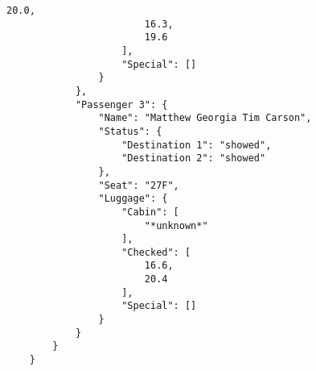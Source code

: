 \begin{lstlisting}[basicstyle=\scriptsize]
                        20.0,
                        16.3,
                        19.6
                    ],
                    "Special": []
                }
            },
            "Passenger 3": {
                "Name": "Matthew Georgia Tim Carson",
                "Status": {
                    "Destination 1": "showed",
                    "Destination 2": "showed"
                },
                "Seat": "27F",
                "Luggage": {
                    "Cabin": [
                        "*unknown*"
                    ],
                    "Checked": [
                        16.6,
                        20.4
                    ],
                    "Special": []
                }
            }
        }
    }
\end{lstlisting}


\pagebreak
